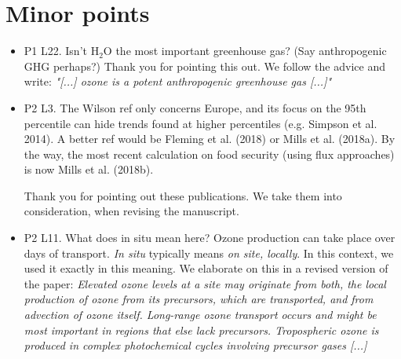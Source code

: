 \section{Minor points}
\begin{itemize}
\item {\color{blue}P1 L22. Isn’t $\mathrm{H_2O}$ the most important greenhouse gas? (Say anthropogenic
  GHG perhaps?)}
  Thank you for pointing this out. We follow the advice and write: \emph{"[...] ozone is a potent anthropogenic greenhouse gas [...]"}
\item {\color{blue}P2 L3. The Wilson ref only concerns Europe, and its focus on the 95th percentile can hide trends
  found at higher percentiles (e.g. Simpson et al. 2014). A better ref would be Fleming et al. (2018) or Mills et al. (2018a). By the way, the most recent calculation on food security (using flux approaches) is now Mills et al. (2018b).}
  
  Thank you for pointing out these publications. We take them into consideration, when revising the manuscript.
\item {\color{blue}P2 L11. What does in situ mean here? Ozone production can take place over
  days of transport.}
  \emph{In situ} typically means \emph{on site, locally}. In this context, we used it exactly in this meaning. We elaborate on this in a revised version of the paper: \emph{Elevated ozone levels at a site may originate from both, the local production of ozone from its precursors, which are transported, and from advection of ozone itself. Long-range ozone transport occurs and might be most important in regions that else lack precursors. Tropospheric ozone is produced in complex photochemical cycles involving precursor gases [...]}
  

\end{itemize}
